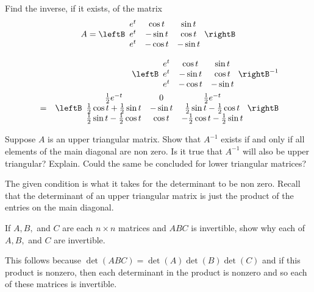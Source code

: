 \begin{enumialphparenastyle}
\begin{ex} Find the inverse, if it exists, of the matrix 
\begin{equation*}
A = 
\leftB
\begin{array}{ccc}
e^{t} & \cos t & \sin t \\
e^{t} & -\sin t & \cos t \\
e^{t} & -\cos t & -\sin t
\end{array}
\rightB 
\end{equation*}
\begin{sol}
\begin{eqnarray*}
&&\leftB
\begin{array}{ccc}
e^{t} & \cos t & \sin t \\
e^{t} & -\sin t & \cos t \\
e^{t} & -\cos t & -\sin t
\end{array}
\rightB ^{-1} \\
&=&\leftB
\begin{array}{ccc}
\frac{1}{2}e^{-t} & 0 & \frac{1}{2}e^{-t} \\
\frac{1}{2}\cos t+\frac{1}{2}\sin t & -\sin t & \frac{1}{2}\sin t-\frac{1}{2}
\cos t \\
\frac{1}{2}\sin t-\frac{1}{2}\cos t & \cos t & -\frac{1}{2}\cos t-\frac{1}{2}
\sin t
\end{array}
\rightB 
\end{eqnarray*}
\end{sol}
\end{ex}

\begin{ex} Suppose $A$ is an upper triangular matrix. Show that $A^{-1}$ exists
if and only if all elements of the main diagonal are non zero. Is it true
that $A^{-1}$ will also be upper triangular? Explain. Could the same be concluded for lower triangular matrices? 
\begin{sol}
The given condition is what it takes for the
determinant to be non zero. Recall that the determinant of an upper
triangular matrix is just the product of the entries on the main diagonal.
\end{sol}
\end{ex}

\begin{ex} If $A,B,$ and $C$ are each $n\times n$ matrices and $ABC$ is
invertible, show why each of $A,B,$ and $C$ are invertible.
\begin{sol}
This follows
because $\det \left( ABC\right) =\det \left( A\right) \det \left( B\right)
\det \left( C\right) $ and if this product is nonzero, then each determinant
in the product is nonzero and so each of these matrices is invertible.
\end{sol}
\end{ex}

\end{enumialphparenastyle}